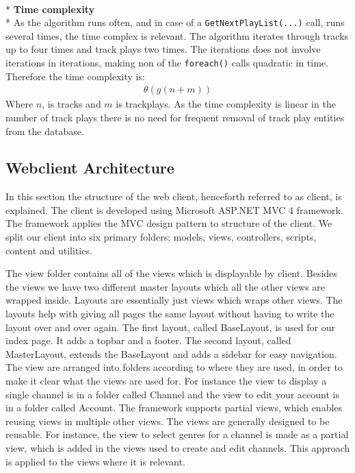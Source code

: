 \documentclass[a4paper,11pt,report]{article}
\begin{document}
\textbf{ } \\*
\textbf{Time complexity} \\*
As the algorithm runs often, and in case of a \texttt{GetNextPlayList(...)} call, runs several times, the time complex is relevant. The algorithm iterates through tracks up to four times and track plays two times. The iterations does not involve iterations in iterations, making non of the \texttt{foreach()} calls quadratic in time. Therefore the time complexity is: 
\begin{align*}
\theta (g(n + m))
\end{align*}
Where \begin{math}n\end{math}, is tracks and \begin{math}m\end{math} is trackplays. As the time complexity is linear in the number of track plays there is no need for frequent removal of track play entities from the database.

\subsection{Webclient Architecture}
In this section the structure of the web client, henceforth referred to as client, is explained.
The client is developed using Microsoft ASP.NET MVC 4 framework. The framework applies the MVC design pattern to structure of the client.
We split our client into six primary folders; models, views, controllers, scripts, content and utilities.

The view folder contains all of the views which is displayable by client. Besides the views we have two different master layouts which all the other views are wrapped inside. Layouts are essentially just views which wraps other views.
The layouts help with giving all pages the same layout without having to write the layout over and over again. The first layout, called BaseLayout, is used for our index page. It adds a topbar and a footer. The second layout, called MasterLayout, extends the BaseLayout and adds a sidebar for easy navigation.
The view are arranged into folders according to where they are used, in order to make it clear what the views are used for. For instance the view to display a single channel is in a folder called Channel and the view to edit your account is in a folder called Account.
The framework supports partial views, which enables reusing views in multiple other views.
The views are generally designed to be reusable. For instance, the view to select genres for a channel is made as a partial view, which is added in the views used to create and edit channels. This approach is applied to the views where it is relevant.
\end{document}

